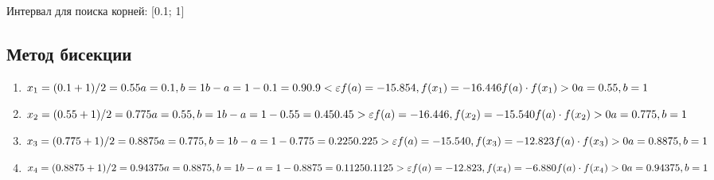 \documentclass{article}
\begin{document}
Интервал для поиска корней: [0.1; 1]

\subsection{Метод бисекции}
\begin{enumerate}[label= итерация \arabic{*}:]
  \item 
  \begin{math}
    x_{1}=(0.1+1)/2=0.55\\
    a=0.1, b=1\\
    b-a=1-0.1= 0.9\\
    0.9 < \varepsilon \\
    f(a)=-15.854, f(x_{1})= -16.446\\
    f(a) \cdot f(x_{1}) > 0\\
    a=0.55, b=1\\
  \end{math}
  
  \item
  \begin{math}
    x_{2}=(0.55+1)/2=0.775\\
    a=0.55, b=1\\
    b-a=1-0.55= 0.45\\
    0.45 > \varepsilon \\
    f(a)=-16.446, f(x_{2})= -15.540\\
    f(a) \cdot f(x_{2}) > 0 \\
    a=0.775, b=1\\
  \end{math}
  
  \item
  \begin{math}
    x_{3}=(0.775+1)/2=0.8875\\
    a=0.775, b=1\\
    b-a=1-0.775= 0.225\\
    0.225 > \varepsilon \\
    f(a)=-15.540, f(x_{3})= -12.823\\
    f(a) \cdot f(x_{3}) > 0 \\
    a=0.8875, b=1\\
  \end{math}
  
  \item
  \begin{math}
    x_{4}=(0.8875+1)/2=0.94375\\
    a=0.8875, b=1\\
    b-a=1-0.8875= 0.1125\\
    0.1125 > \varepsilon \\
    f(a)=-12.823, f(x_{4})= -6.880\\
    f(a) \cdot f(x_{4}) > 0 \\
    a=0.94375, b=1\\
  \end{math}


\end{enumerate}
\end{document}
